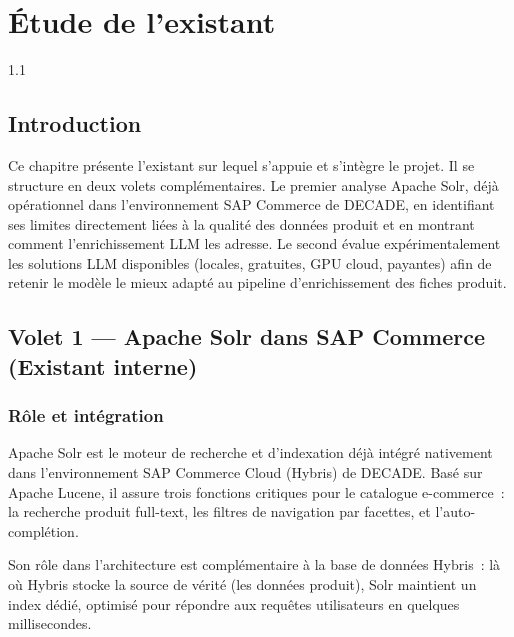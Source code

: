 \chapter{Étude de l'existant}
\label{chap:etude-existant}
\begin{spacing}{1.1}
\minitoc
\thispagestyle{MyStyle}
\end{spacing}
\newpage

\section{Introduction}
Ce chapitre présente l'existant sur lequel s'appuie et s'intègre le projet. Il se structure en deux volets complémentaires. Le premier analyse Apache Solr, déjà opérationnel dans l'environnement SAP Commerce de DECADE, en identifiant ses limites directement liées à la qualité des données produit et en montrant comment l'enrichissement LLM les adresse. Le second évalue expérimentalement les solutions LLM disponibles (locales, gratuites, GPU cloud, payantes) afin de retenir le modèle le mieux adapté au pipeline d'enrichissement des fiches produit.

\section{Volet 1 — Apache Solr dans SAP Commerce (Existant interne)}

\subsection{Rôle et intégration}
Apache Solr est le moteur de recherche et d'indexation déjà intégré nativement dans l'environnement SAP Commerce Cloud (Hybris) de DECADE. Basé sur Apache Lucene, il assure trois fonctions critiques pour le catalogue e-commerce~: la recherche produit full-text, les filtres de navigation par facettes, et l'auto-complétion.

Son rôle dans l'architecture est complémentaire à la base de données Hybris~: là où Hybris stocke la source de vérité (les données produit), Solr maintient un index dédié, optimisé pour répondre aux requêtes utilisateurs en quelques millisecondes.

